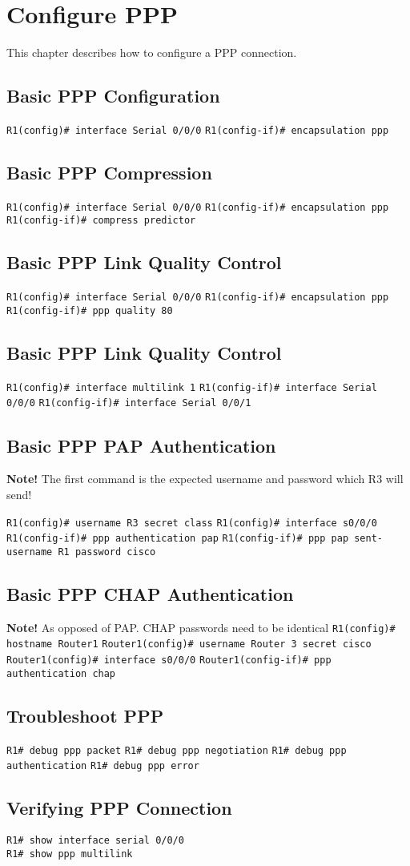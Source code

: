 \section{Configure PPP}
This chapter describes how to configure a PPP connection.
\subsection{Basic PPP Configuration}
\verb!R1(config)# interface Serial 0/0/0!
\verb!R1(config-if)# encapsulation ppp!
\subsection{Basic PPP Compression}
\verb!R1(config)# interface Serial 0/0/0!
\verb!R1(config-if)# encapsulation ppp!
\verb!R1(config-if)# compress predictor!
\subsection{Basic PPP Link Quality Control}
\verb!R1(config)# interface Serial 0/0/0!
\verb!R1(config-if)# encapsulation ppp!
\verb!R1(config-if)# ppp quality 80!
\subsection{Basic PPP Link Quality Control}
\verb!R1(config)# interface multilink 1!
\verb!R1(config-if)# interface Serial 0/0/0!
\verb!R1(config-if)# interface Serial 0/0/1!

\subsection{Basic PPP PAP Authentication}
\textbf{Note!} The first command is the expected username and password which R3 will send!

\verb!R1(config)# username R3 secret class!
\verb!R1(config)# interface s0/0/0!
\verb!R1(config-if)# ppp authentication pap!
\verb!R1(config-if)# ppp pap sent-username R1 password cisco!

\subsection{Basic PPP CHAP Authentication}
\textbf{Note!} As opposed of PAP. CHAP passwords need to be identical
\verb!R1(config)# hostname Router1!
\verb!Router1(config)# username Router 3 secret cisco!
\verb!Router1(config)# interface s0/0/0!
\verb!Router1(config-if)# ppp authentication chap!

\subsection{Troubleshoot PPP}
\verb!R1# debug ppp packet!
\verb!R1# debug ppp negotiation!
\verb!R1# debug ppp authentication!
\verb!R1# debug ppp error!

\subsection{Verifying PPP Connection}
\verb!R1# show interface serial 0/0/0! \\
\verb!R1# show ppp multilink!
